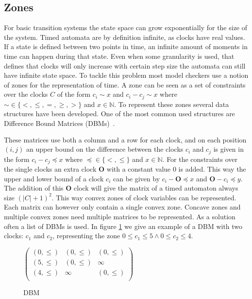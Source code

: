 \subsection{Zones}
For basic transition systems the state space can grow exponentially for the size of the system. Timed automata are by definition infinite, as clocks have real values. If a state is defined between two points in time, an infinite amount of moments in time can happen during that state. Even when some granularity is used, that defines that clocks will only increase with certain step size the automata can still have infinite state space. To tackle this problem most model checkers use a notion of zones for the representation of time. A zone can be seen as a set of constraints over the clocks $C$
 of the form $c_i \sim x$ and $c_i - c_j \sim x$ where $\sim  \in \{<, \leq, =, \geq, >\}$ and $x \in \mathbb{N}$. To represent these zones several data structures have been developed. One of the most common used structures are Difference Bound Matrices (DBMs)~\cite{dbmorig,bengtsson2002clocks}.
 
These matrices use both a column and a row for each clock, and on each position $(i,j)$ an upper bound on the difference between the clocks $c_i$ and $c_j$ is given in the form $c_i - c_j \preceq x$ where $\preceq \in \{<, \leq\}$ and $x \in \mathbb{N}$. For the constraints over the single clocks an extra clock $\mathbf{O}$ with a constant value 0 is added. This way the upper and lower bound of a clock $c_i$ can be given by $c_i - \mathbf{O} \preceq x$ and $\mathbf{O} - c_i \preceq y$. The addition of this $\mathbf{O}$ clock will give the matrix of a timed automaton always size $(|C|+1)^2$. This way convex zones of clock variables can be represented. Each matrix can however only contain a single convex zone. Concave zones and multiple convex zones need multiple matrices to be represented. As a solution often a list of DBMs is used. In figure \ref{fig:dbm} we give an example of a DBM with two clocks: $c_1$ and $c_2$, representing the zone $0 \leq c_1 \leq 5 \wedge 0 \leq c_2 \leq 4$.

\begin{figure}
	\centering
	\begin{math}
 		\begin{pmatrix}
 			(0,\leq) & (0,\leq) & (0,\leq) \\
 			(5,\leq) & (0,\leq) & \infty   \\
 			(4,\leq) & \infty   & (0,\leq) \\
 		\end{pmatrix}
	\end{math}
	\caption{DBM}
	\label{fig:dbm}
\end{figure}

